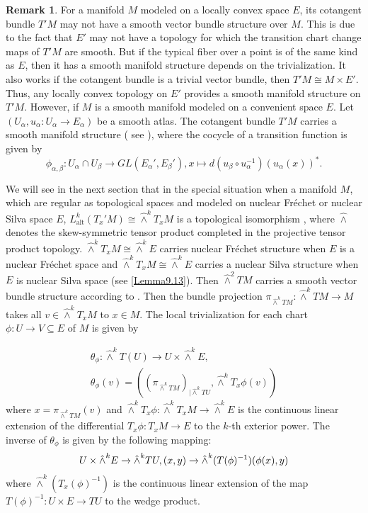\documentclass[11pt,reqno]{amsart}
\theoremstyle{definition}
\newtheorem{remark}[theorem]{Remark}
\numberwithin{equation}{section}
\begin{document}
 
\begin{remark}
    

For a manifold $M$ modeled on a locally convex space $E$, its cotangent bundle $T'M$ may not have a smooth vector bundle structure over $M$. This is due to the fact that $E'$ may not have a topology for which the transition chart change maps of $T'M$ are smooth. But if the typical fiber over a point is of the same kind as $E$, then it has a smooth manifold structure depends on the trivialization. It also works if the cotangent bundle is a trivial vector bundle, then $T'M\cong M\times E'$. Thus, any locally convex topology on $E'$ provides a smooth manifold structure on $T'M$. However, if $M$ is a smooth manifold modeled on a convenient space $E$. Let $(U_\alpha,u_\alpha:U_\alpha\to E_\alpha)$ be a smooth atlas. The cotangent bundle $T'M$ carries a smooth manifold structure ( see \cite[33.1]{20}), where the cocycle of a transition function is given by  \[ \phi_{\alpha,\beta}:U_{\alpha}\cap U_{\beta} \to GL(E_\alpha', E_\beta'), x\mapsto d(u_{\beta}\circ u_{\alpha}^{-1})(u_\alpha(x))^*.\]



\end{remark}
We will see in the next section that in the special situation when a manifold $M$, which are regular as topological spaces and modeled on nuclear Fréchet or nuclear Silva space $E$, $L_{\text{alt}}^{k}(T_{x}'M) \cong \hat\wedge^{k}T_{x}M$ is a topological isomorphism \cite[Corollary 2, 21.2]{17}, where $\hat\wedge$ denotes the skew-symmetric tensor product completed in the projective tensor product topology. $\hat\wedge^{k}T_{x}M\cong \hat\wedge^kE$ carries nuclear Fr\'{e}chet structure when $E$ is a nuclear Fr\'{e}chet space and $\hat\wedge^{k}T_{x}M\cong \hat\wedge^kE$ carries a nuclear Silva structure when $E$ is nuclear Silva space (see \ref{Lemma9.13}). Then $\hat\wedge^2TM$ carries a smooth vector bundle structure according to \cite[Definition 3.7.1]{11}. Then the bundle projection $\pi_{\hat\wedge^kTM}: \hat\wedge^kTM \to M$ takes all $v\in \hat\wedge^kT_xM$ to $x\in M$. 
The local trivialization for each chart $\phi: U \to V \subseteq E$ of $M$ is given by

\begin{align*}\theta_\phi : \hat\wedge^kT(U) \to U \times \hat\wedge^kE, \\
\theta_\phi(v)= ((\pi_{\hat\wedge^k TM})_{|\hat\wedge^kTU},\hat\wedge ^kT_x\phi(v))
\end{align*} where $x=\pi_{\hat\wedge^k TM}(v)$ and $\hat\wedge ^kT_x\phi: \hat\wedge^kT_xM \to\hat\wedge^k E$ is the continuous linear extension of the differential $T_x\phi: T_xM\to E$ to the $k$-th exterior power.
 The inverse of $\theta_\phi$ is given by the following mapping: 
 \[U \times \hat\wedge^k E \to \hat\wedge^kTU,\\
(x,y)\to \hat\wedge ^k(T(\phi)^{-1})(\phi(x),y)\]
where $\hat\wedge ^k(T_{x}(\phi)^{-1})$ is the continuous linear extension of the map $T(\phi)^{-1}: U\times E\to TU$ to the wedge product. 
\end{document}
